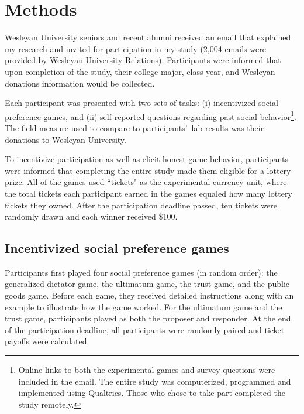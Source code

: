 \documentclass[12pt]{article}
\begin{document}
\section{Methods}
 
Wesleyan University seniors and recent alumni received an email that explained my research and invited for participation in my study (2,004 emails were provided by Wesleyan University Relations). Participants were informed that upon completion of the study, their college major, class year, and Wesleyan donations information would be collected.

Each participant was presented with two sets of tasks: (i) incentivized social preference games, and (ii) self-reported questions regarding past social behavior\footnote{Online links to both the experimental games and survey questions were included in the email. The entire study was computerized, programmed and implemented using Qualtrics. Those who chose to take part completed the study remotely.}. The field measure used to compare to participants\rq \ lab results was their donations to Wesleyan University.  

To incentivize participation as well as elicit honest game behavior, participants were informed that completing the entire study made them eligible for a lottery prize. All of the games used ``tickets" as the experimental currency unit, where the total tickets each participant earned in the games equaled how many lottery tickets they owned. After the participation deadline passed, ten tickets were randomly drawn and each winner received \$100.


\subsection{Incentivized social preference games}


Participants first played four social preference games (in random order): the generalized dictator game, the ultimatum game, the trust game, and the public goods game. Before each game, they received detailed instructions along with an example to illustrate how the game worked. For the ultimatum game and the trust game, participants played as both the proposer and responder. At the end of the participation deadline, all participants were randomly paired and ticket payoffs were calculated.
\end{document}
